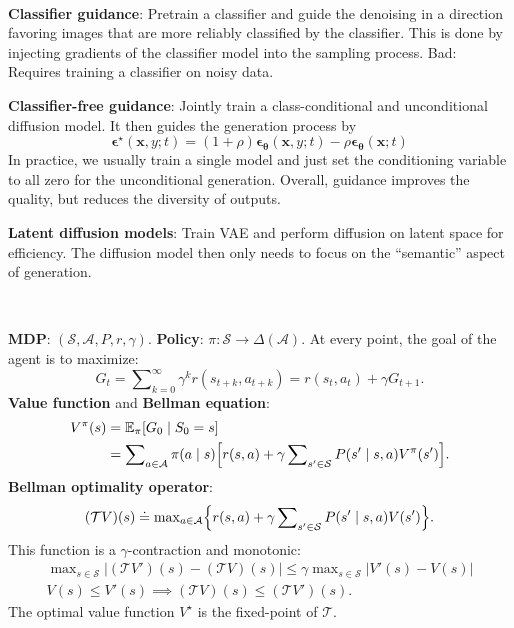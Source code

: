 \documentclass{article}
\newcommand{\lft}{\mathopen{}\mathclose\bgroup\left}
\newcommand{\rgt}{\aftergroup\egroup\right}
\newcommand{\E}{\mathbb{E}}
\renewcommand{\vec}[1]{\bm{#1}}
\newenvironment{topic}[1]
{\textbf{\sffamily \colorbox{black}{\rlap{\textbf{\textcolor{white}{#1}}}\hspace{\linewidth}\hspace{-2\fboxsep}}} \\ \vspace{0.2cm}}
{}
\begin{document}
\begin{multicols*}{2}
\begin{topic}{Diffusion models}
        \textbf{Classifier guidance}: Pretrain a classifier and guide the denoising in a direction
        favoring images that are more reliably classified by the classifier. This is done by
        injecting gradients of the classifier model into the sampling process. Bad: Requires
        training a classifier on noisy data.

        \textbf{Classifier-free guidance}: Jointly train a class-conditional and unconditional diffusion model. It then guides the generation process by \[
            \vec{\epsilon}^\star(\vec{x}, y; t) = (1 + \rho) \vec{\epsilon}_{\vec{\theta}}(\vec{x}, y; t) - \rho \vec{\epsilon}_{\vec{\theta}}(\vec{x}; t)
        \]
        In practice, we usually train a single model and just set the conditioning variable to all zero for
        the unconditional generation. Overall, guidance improves the quality, but reduces the diversity of
        outputs.

        \textbf{Latent diffusion models}: Train VAE and perform diffusion on latent space for
        efficiency. The diffusion model then only needs to focus on the ``semantic'' aspect of
        generation.

    \end{topic}

    \begin{topic}{Reinforcement learning}

        \textbf{MDP}: $(\mathcal{S}, \mathcal{A}, P, r, \gamma)$. \textbf{Policy}: $\pi: \mathcal{S} \to
            \Delta(\mathcal{A})$. At every point, the goal of the agent is to maximize: \[
            G_t = \sum\nolimits_{k=0}^{\infty} \gamma^k r(s_{t+k}, a_{t+k}) = r(s_t, a_t) + \gamma G_{t+1}.
        \]
        \textbf{Value function} and \textbf{Bellman equation}:
        \begin{align*}
            V^\pi(s) & = \E_{\pi} [G_0 \mid S_0 = s]                                                                                                               \\
                     & = \sum\nolimits_{a \in \mathcal{A}} \pi(a \mid s) \lft[ r(s,a) + \gamma \sum\nolimits_{s' \in \mathcal{S}} P(s' \mid s, a) V^\pi(s') \rgt].
        \end{align*}
        \textbf{Bellman optimality operator}: \[
            (\mathcal{T} V) (s) \doteq \max\nolimits_{a \in \mathcal{A}} \lft\{ r(s,a) + \gamma \sum\nolimits_{s' \in \mathcal{S}} P(s' \mid s, a) V(s') \rgt\}.
        \]
        This function is a $\gamma$-contraction and monotonic:
        \begin{gather*}
            \max\nolimits_{s \in \mathcal{S}} |(\mathcal{T}V')(s) - (\mathcal{T}V)(s)| \leq \gamma \max\nolimits_{s \in \mathcal{S}} |V'(s) - V(s)| \\
            V(s) \leq V'(s) \implies (\mathcal{T}V)(s) \leq (\mathcal{T}V')(s).
        \end{gather*}
        The optimal value function $V^\star$ is the fixed-point of $\mathcal{T}$.


\end{topic}
\end{multicols*}
\end{document}
